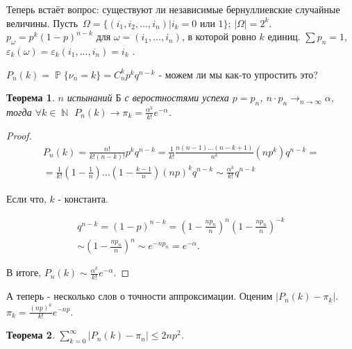 \documentclass[a4paper,100pt]{article}
\theoremstyle{indented}
\newtheorem{theorem}{Теорема}
\theoremstyle{definition}
\theoremstyle{remark}
\DeclareMathOperator{\NN}{\mathbb{N}}
\DeclareMathOperator{\PP}{\mathbb{P}}
\begin{document}
Теперь встаёт вопрос: существуют ли независимые бернуллиевские случайные величины. Пусть $\Omega=\{(i_1, i_2, \ldots, i_n)|i_k=0 \text{ или }1\}$; $|\Omega|=2^k$. $p_{\omega}= p^k(1-p)^{n-k}$ для $\omega=(i_1, \ldots, i_n)$, в которой ровно $k$ единиц. $\sum p_n=1$, $\varepsilon_k(\omega)=\varepsilon_k(i_1, \ldots, i_n)=i_k$ .\

$P_n(k)=\PP\{\nu_n=k\}=C_n^kp^kq^{n-k}$ - можем ли мы как-то упростить это? \\

\begin{theorem}
    $n$ испынаний $\text{Б}$ с веростностями успеха $p=p_n$, $n\cdot p_n\rightarrow_{n\rightarrow \infty} \alpha$, тогда $\forall k\in \NN$ $P_n(k)\rightarrow \pi_k=\frac{\alpha^k}{k!}e^{-\alpha}$. 
\end{theorem}

\begin{proof}
    \begin{equation*}
        \begin{split}
            P_n(k)=\frac{n!}{k!(n-k)!}p^kq^{n-k}=\frac{1}{k!}\frac{n(n-1)\ldots(n-k+1)}{n^k}(np^k)q^{n-k}= \\ 
            = \frac{1}{k!}{(1-\frac{1}{n})\ldots(1-\frac{k-1}{n})}(np)^kq^{n-k}\sim\frac{\alpha^k}{k!}q^{n-k}
        \end{split}
    \end{equation*}

    Если что, $k$ - константа. 

    \begin{equation*}
        \begin{split}
            q^{n-k}=(1-p)^{n-k}=(1-\frac{n p_n}{n})^n(1-\frac{n p_n}{n})^{-k} \\ 
            \sim (1-\frac{n p_n}{n})^n \sim e^{-n p_n} = e^{-\alpha}. 
        \end{split}
    \end{equation*}

    В итоге, $P_n(k)\sim\frac{\alpha^k}{k!}e^{-\alpha}$. 

\end{proof}

А теперь - несколько слов о точности аппроксимации. Оценим $|P_n(k)-\pi_k|$. $\pi_k=\frac{(np)^k}{k!}e^{-np}$. \\

\begin{theorem}
    $\sum_{k=0}^\infty|P_n(k)-\pi_n|\leq 2np^2$.
\end{theorem}
\end{document}
